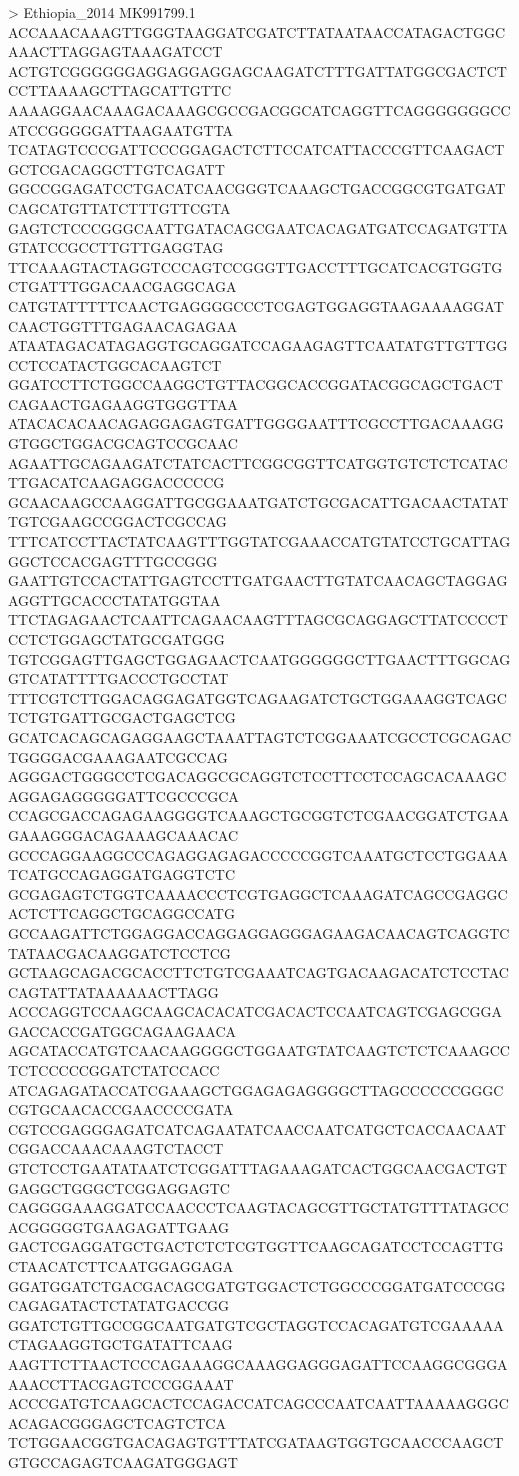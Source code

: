 > Ethiopia_2014 MK991799.1
ACCAAACAAAGTTGGGTAAGGATCGATCTTATAATAACCATAGACTGGCAAACTTAGGAGTAAAGATCCT
ACTGTCGGGGGGAGGAGGAGGAGCAAGATCTTTGATTATGGCGACTCTCCTTAAAAGCTTAGCATTGTTC
AAAAGGAACAAAGACAAAGCGCCGACGGCATCAGGTTCAGGGGGGGCCATCCGGGGGATTAAGAATGTTA
TCATAGTCCCGATTCCCGGAGACTCTTCCATCATTACCCGTTCAAGACTGCTCGACAGGCTTGTCAGATT
GGCCGGAGATCCTGACATCAACGGGTCAAAGCTGACCGGCGTGATGATCAGCATGTTATCTTTGTTCGTA
GAGTCTCCCGGGCAATTGATACAGCGAATCACAGATGATCCAGATGTTAGTATCCGCCTTGTTGAGGTAG
TTCAAAGTACTAGGTCCCAGTCCGGGTTGACCTTTGCATCACGTGGTGCTGATTTGGACAACGAGGCAGA
CATGTATTTTTCAACTGAGGGGCCCTCGAGTGGAGGTAAGAAAAGGATCAACTGGTTTGAGAACAGAGAA
ATAATAGACATAGAGGTGCAGGATCCAGAAGAGTTCAATATGTTGTTGGCCTCCATACTGGCACAAGTCT
GGATCCTTCTGGCCAAGGCTGTTACGGCACCGGATACGGCAGCTGACTCAGAACTGAGAAGGTGGGTTAA
ATACACACAACAGAGGAGAGTGATTGGGGAATTTCGCCTTGACAAAGGGTGGCTGGACGCAGTCCGCAAC
AGAATTGCAGAAGATCTATCACTTCGGCGGTTCATGGTGTCTCTCATACTTGACATCAAGAGGACCCCCG
GCAACAAGCCAAGGATTGCGGAAATGATCTGCGACATTGACAACTATATTGTCGAAGCCGGACTCGCCAG
TTTCATCCTTACTATCAAGTTTGGTATCGAAACCATGTATCCTGCATTAGGGCTCCACGAGTTTGCCGGG
GAATTGTCCACTATTGAGTCCTTGATGAACTTGTATCAACAGCTAGGAGAGGTTGCACCCTATATGGTAA
TTCTAGAGAACTCAATTCAGAACAAGTTTAGCGCAGGAGCTTATCCCCTCCTCTGGAGCTATGCGATGGG
TGTCGGAGTTGAGCTGGAGAACTCAATGGGGGGCTTGAACTTTGGCAGGTCATATTTTGACCCTGCCTAT
TTTCGTCTTGGACAGGAGATGGTCAGAAGATCTGCTGGAAAGGTCAGCTCTGTGATTGCGACTGAGCTCG
GCATCACAGCAGAGGAAGCTAAATTAGTCTCGGAAATCGCCTCGCAGACTGGGGACGAAAGAATCGCCAG
AGGGACTGGGCCTCGACAGGCGCAGGTCTCCTTCCTCCAGCACAAAGCAGGAGAGGGGGATTCGCCCGCA
CCAGCGACCAGAGAAGGGGTCAAAGCTGCGGTCTCGAACGGATCTGAAGAAAGGGACAGAAAGCAAACAC
GCCCAGGAAGGCCCAGAGGAGAGACCCCCGGTCAAATGCTCCTGGAAATCATGCCAGAGGATGAGGTCTC
GCGAGAGTCTGGTCAAAACCCTCGTGAGGCTCAAAGATCAGCCGAGGCACTCTTCAGGCTGCAGGCCATG
GCCAAGATTCTGGAGGACCAGGAGGAGGGAGAAGACAACAGTCAGGTCTATAACGACAAGGATCTCCTCG
GCTAAGCAGACGCACCTTCTGTCGAAATCAGTGACAAGACATCTCCTACCAGTATTATAAAAAACTTAGG
ACCCAGGTCCAAGCAAGCACACATCGACACTCCAATCAGTCGAGCGGAGACCACCGATGGCAGAAGAACA
AGCATACCATGTCAACAAGGGGCTGGAATGTATCAAGTCTCTCAAAGCCTCTCCCCCGGATCTATCCACC
ATCAGAGATACCATCGAAAGCTGGAGAGAGGGGCTTAGCCCCCCGGGCCGTGCAACACCGAACCCCGATA
CGTCCGAGGGAGATCATCAGAATATCAACCAATCATGCTCACCAACAATCGGACCAAACAAAGTCTACCT
GTCTCCTGAATATAATCTCGGATTTAGAAAGATCACTGGCAACGACTGTGAGGCTGGGCTCGGAGGAGTC
CAGGGGAAAGGATCCAACCCTCAAGTACAGCGTTGCTATGTTTATAGCCACGGGGGTGAAGAGATTGAAG
GACTCGAGGATGCTGACTCTCTCGTGGTTCAAGCAGATCCTCCAGTTGCTAACATCTTCAATGGAGGAGA
GGATGGATCTGACGACAGCGATGTGGACTCTGGCCCGGATGATCCCGGCAGAGATACTCTATATGACCGG
GGATCTGTTGCCGGCAATGATGTCGCTAGGTCCACAGATGTCGAAAAACTAGAAGGTGCTGATATTCAAG
AAGTTCTTAACTCCCAGAAAGGCAAAGGAGGGAGATTCCAAGGCGGGAAAACCTTACGAGTCCCGGAAAT
ACCCGATGTCAAGCACTCCAGACCATCAGCCCAATCAATTAAAAAGGGCACAGACGGGAGCTCAGTCTCA
TCTGGAACGGTGACAGAGTGTTTATCGATAAGTGGTGCAACCCAAGCTGTGCCAGAGTCAAGATGGGAGT
